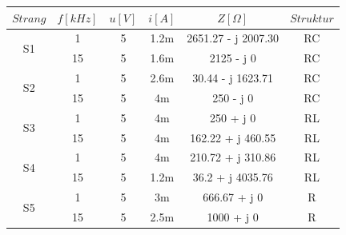 \documentclass[a4paper,12pt]{article}
\begin{document}
	\begin{table}[h]
	\centering
		\begin{tabular}{|c|c|c|c|c|c|}
			\hline
			\multicolumn{1}{|l|}{$Strang$} & \multicolumn{1}{l|}{$f [kHz]$} & \multicolumn{1}{l|}{$u [V]$} & \multicolumn{1}{l|}{$i [A]$} & \multicolumn{1}{c|}{$Z[\Omega]$} & $Struktur$ \\ \hline
			\multirow{2}{*}{S1}            & 1                              & 5                            & 1.2m                         & 2651.27 - j 2007.30              & RC         \\ \cline{2-6} 
			& 15                             & 5                            & 1.6m                         & 2125 - j 0                       & RC         \\ \hline
			\multirow{2}{*}{S2}            & 1                              & 5                            & 2.6m                         & 30.44 - j 1623.71                & RC         \\ \cline{2-6} 
			& 15                             & 5                            & 4m                           & 250 - j 0                        & RC         \\ \hline
			\multirow{2}{*}{S3}            & 1                              & 5                            & 4m                           & 250 + j 0                        & RL         \\ \cline{2-6} 
			& 15                             & 5                            & 4m                           & 162.22 + j 460.55                & RL         \\ \hline
			\multirow{2}{*}{S4}            & 1                              & 5                            & 4m                           & 210.72 + j 310.86                & RL         \\ \cline{2-6} 
			& 15                             & 5                            & 1.2m                         & 36.2 + j 4035.76                 & RL         \\ \hline
			\multirow{2}{*}{S5}            & 1                              & 5                            & 3m                           & 666.67 + j 0                     & R          \\ \cline{2-6} 
			& 15                             & 5                            & 2.5m                         & 1000 + j 0                       & R          \\ \hline
		\end{tabular}
	\end{table}
\end{document}
